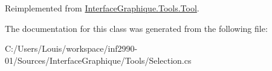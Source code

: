 Reimplemented from \hyperlink{class_interface_graphique_1_1_tools_1_1_tool_aedd1c93f96ee602475b7cbc3c9c99baa}{Interface\+Graphique.\+Tools.\+Tool}.



The documentation for this class was generated from the following file\+:\begin{DoxyCompactItemize}
\item 
C\+:/\+Users/\+Louis/workspace/inf2990-\/01/\+Sources/\+Interface\+Graphique/\+Tools/Selection.\+cs\end{DoxyCompactItemize}
